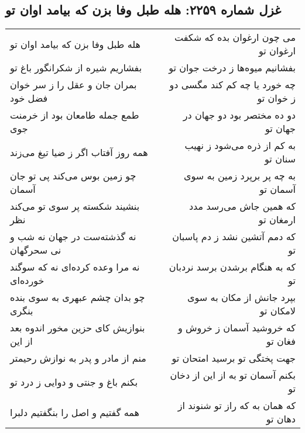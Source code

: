 \begin{center}
\section*{غزل شماره ۲۲۵۹: هله طبل وفا بزن که بیامد اوان تو}
\label{sec:2259}
\begin{longtable}{l p{0.5cm} r}
هله طبل وفا بزن که بیامد اوان تو
&&
می چون ارغوان بده که شکفت ارغوان تو
\\
بفشاریم شیره از شکرانگور باغ تو
&&
بفشانیم میوه‌ها ز درخت جوان تو
\\
بمران جان و عقل را ز سر خوان فضل خود
&&
چه خورد یا چه کم کند مگسی دو ز خوان تو
\\
طمع جمله طامعان بود از خرمنت جوی
&&
دو ده مختصر بود دو جهان در جهان تو
\\
همه روز آفتاب اگر ز ضیا تیغ می‌زند
&&
به کم از ذره می‌شود ز نهیب سنان تو
\\
چو زمین بوس می‌کند پی تو جان آسمان
&&
به چه پر برپرد زمین به سوی آسمان تو
\\
بنشیند شکسته پر سوی تو می‌کند نظر
&&
که همین جاش می‌رسد مدد ارمغان تو
\\
نه گذشته‌ست در جهان نه شب و نی سحرگهان
&&
که دمم آتشین نشد ز دم پاسبان تو
\\
نه مرا وعده کرده‌ای نه که سوگند خورده‌ای
&&
که به هنگام برشدن برسد نردبان تو
\\
چو بدان چشم عبهری به سوی بنده بنگری
&&
بپرد جانش از مکان به سوی لامکان تو
\\
بنوازیش کای حزین مخور اندوه بعد از این
&&
که خروشید آسمان ز خروش و فغان تو
\\
منم از مادر و پدر به نوازش رحیمتر
&&
جهت پختگی تو برسید امتحان تو
\\
بکنم باغ و جنتی و دوایی ز درد تو
&&
بکنم آسمان تو به از این از دخان تو
\\
همه گفتیم و اصل را بنگفتیم دلبرا
&&
که همان به که راز تو شنوند از دهان تو
\\
\end{longtable}
\end{center}

